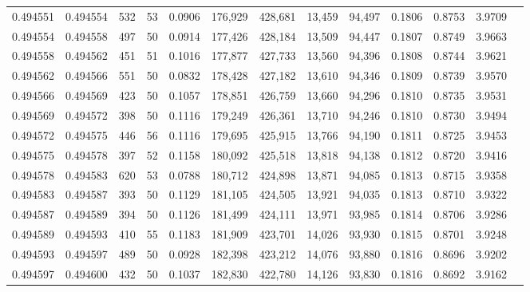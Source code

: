 \begin{tabular}{rrrrrrrrrrrrr}
0.494551 & 0.494554 &   532 &  53 &                                     0.0906 & 176,929 & 428,681 &  13,459 &  94,497 & 0.1806 & 0.8753 & 3.9709 \\
0.494554 & 0.494558 &   497 &  50 &                                     0.0914 & 177,426 & 428,184 &  13,509 &  94,447 & 0.1807 & 0.8749 & 3.9663 \\
0.494558 & 0.494562 &   451 &  51 &                                     0.1016 & 177,877 & 427,733 &  13,560 &  94,396 & 0.1808 & 0.8744 & 3.9621 \\
0.494562 & 0.494566 &   551 &  50 &                                     0.0832 & 178,428 & 427,182 &  13,610 &  94,346 & 0.1809 & 0.8739 & 3.9570 \\
0.494566 & 0.494569 &   423 &  50 &                                     0.1057 & 178,851 & 426,759 &  13,660 &  94,296 & 0.1810 & 0.8735 & 3.9531 \\
0.494569 & 0.494572 &   398 &  50 &                                     0.1116 & 179,249 & 426,361 &  13,710 &  94,246 & 0.1810 & 0.8730 & 3.9494 \\
0.494572 & 0.494575 &   446 &  56 &                                     0.1116 & 179,695 & 425,915 &  13,766 &  94,190 & 0.1811 & 0.8725 & 3.9453 \\
0.494575 & 0.494578 &   397 &  52 &                                     0.1158 & 180,092 & 425,518 &  13,818 &  94,138 & 0.1812 & 0.8720 & 3.9416 \\
0.494578 & 0.494583 &   620 &  53 &                                     0.0788 & 180,712 & 424,898 &  13,871 &  94,085 & 0.1813 & 0.8715 & 3.9358 \\
0.494583 & 0.494587 &   393 &  50 &                                     0.1129 & 181,105 & 424,505 &  13,921 &  94,035 & 0.1813 & 0.8710 & 3.9322 \\
0.494587 & 0.494589 &   394 &  50 &                                     0.1126 & 181,499 & 424,111 &  13,971 &  93,985 & 0.1814 & 0.8706 & 3.9286 \\
0.494589 & 0.494593 &   410 &  55 &                                     0.1183 & 181,909 & 423,701 &  14,026 &  93,930 & 0.1815 & 0.8701 & 3.9248 \\
0.494593 & 0.494597 &   489 &  50 &                                     0.0928 & 182,398 & 423,212 &  14,076 &  93,880 & 0.1816 & 0.8696 & 3.9202 \\
0.494597 & 0.494600 &   432 &  50 &                                     0.1037 & 182,830 & 422,780 &  14,126 &  93,830 & 0.1816 & 0.8692 & 3.9162 \\

\end{tabular}
